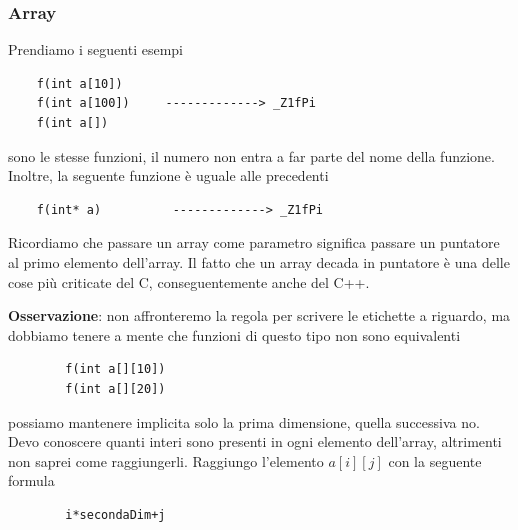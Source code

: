 \subsubsection{Array}
Prendiamo i seguenti esempi
\begin{verbatim}
	f(int a[10])
	f(int a[100])     -------------> _Z1fPi
	f(int a[])
\end{verbatim}
sono le stesse funzioni, il numero non entra a far parte del nome della funzione. Inoltre, la seguente funzione è uguale alle precedenti
\begin{verbatim}
	f(int* a)          -------------> _Z1fPi
\end{verbatim}
Ricordiamo che passare un array come parametro significa passare un puntatore al primo elemento dell'array. Il fatto che un array decada in puntatore è una delle cose più criticate del C, conseguentemente anche del C++.\begin{framed}\noindent \textbf{Osservazione}: non affronteremo la regola per scrivere le etichette a riguardo, ma dobbiamo tenere a mente che funzioni di questo tipo non sono equivalenti
	\begin{verbatim}
		f(int a[][10])
		f(int a[][20])
	\end{verbatim} 
	possiamo mantenere implicita solo la prima dimensione, quella successiva no. Devo conoscere quanti interi sono presenti in ogni elemento dell'array, altrimenti non saprei come raggiungerli. Raggiungo l'elemento $a[i][j]$ con la seguente formula
	\begin{verbatim}
		i*secondaDim+j
	\end{verbatim}
\end{framed}

